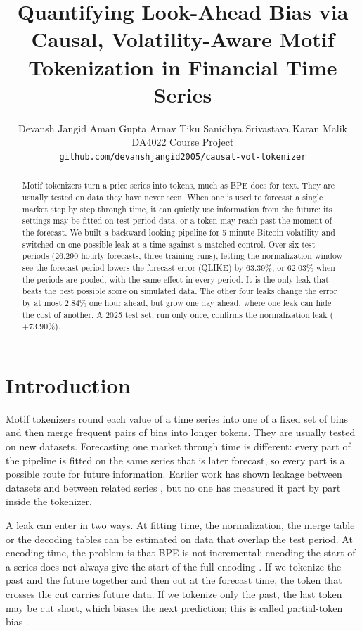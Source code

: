 \documentclass{article}
\title{Quantifying Look-Ahead Bias via Causal, Volatility-Aware Motif Tokenization in Financial Time Series}
\author{%
  Devansh Jangid \quad Aman Gupta \quad Arnav Tiku \quad Sanidhya Srivastava \quad Karan Malik \\
  DA4022 Course Project \\
  \texttt{github.com/devanshjangid2005/causal-vol-tokenizer}
}
\begin{document}
\maketitle

\begin{abstract}
Motif tokenizers turn a price series into tokens, much as BPE does for text. They are usually tested
on data they have never seen. When one is used to forecast a single market step by step through time,
it can quietly use information from the future: its settings may be fitted on test-period data, or a
token may reach past the moment of the forecast. We built a backward-looking pipeline for 5-minute
Bitcoin volatility and switched on one possible leak at a time against a matched control. Over six test periods (26,290
hourly forecasts, three training runs), letting the normalization window see the forecast period
lowers the forecast error (QLIKE) by 63.39\%, or 62.03\% when the periods are pooled, with the same
effect in every period. It is the only leak that beats the best possible score on simulated data. The
other four leaks change the error by at most 2.84\% one hour ahead, but grow one day ahead, where one
leak can hide the cost of another. A 2025 test set, run only once, confirms the normalization leak
($+73.90\%$).
\end{abstract}

\section{Introduction}

Motif tokenizers \citep{gotz2026bpe} round each value of a time series into one of a fixed set of bins
and then merge frequent pairs of bins into longer tokens. They are usually tested on new datasets. Forecasting one
market through time is different: every part of the pipeline is fitted on the same series that is
later forecast, so every part is a possible route for future information. Earlier work has shown
leakage between datasets and between related series \citep{meyer2025leakage}, but no one has measured
it part by part inside the tokenizer.

A leak can enter in two ways. At fitting time, the normalization, the merge table or the decoding
tables can be estimated on data that overlap the test period. At encoding time, the problem is that
BPE is not incremental: encoding the start of a series does not always give the start of the full
encoding \citep{zhang2026unitok}. If we tokenize the past and the future together and then cut at the
forecast time, the token that crosses the cut carries future data. If we tokenize only the past, the
last token may be cut short, which biases the next prediction; this is called partial-token bias
\citep{phan2024tokenization}.
\end{document}
